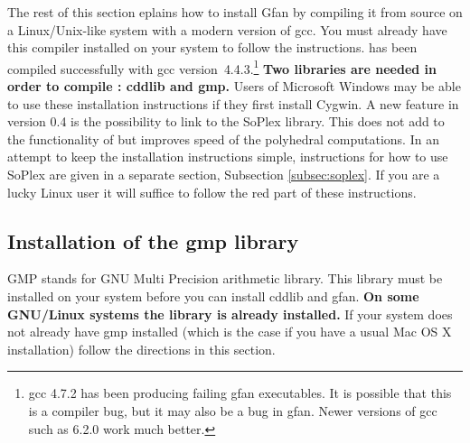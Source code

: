 


The rest of this section eplains how to install Gfan by compiling it from source on a Linux/Unix-like
system with a modern version of gcc. You must already have this compiler installed on your system to follow the instructions. \name has been compiled
successfully with gcc version~4.4.3.\footnote{gcc 4.7.2 has been producing failing gfan executables. It is possible that this is a compiler bug, but it may also be a bug in gfan. Newer versions of gcc such as 6.2.0 work much better.} {\bf Two libraries are needed in order
to compile \name: {cddlib} and { gmp}.} Users of Microsoft
Windows may be able to use these installation instructions if they
first install Cygwin. A new feature in \name version 0.4 is the
possibility to link to the SoPlex \cite{wunderling} library. This does
not add to the functionality of \name but improves speed of the
polyhedral computations. In an attempt to keep the installation instructions simple, instructions for how to use SoPlex are given in a separate section, Subsection \ref{subsec:soplex}. {\color{red} If you are a lucky Linux user it will suffice to follow the red part of these instructions.}

\subsection{Installation of the gmp library}
GMP stands for GNU Multi Precision arithmetic library. This library
must be installed on your system before you can install cddlib and
gfan.
{\color{red}
{\bf On some GNU/Linux systems the library is already installed.}}
If your system does not already
have gmp installed (which is the case if you have a usual Mac OS X
installation) follow the directions in this section.

